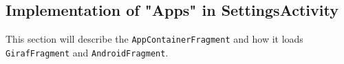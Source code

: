 \subsection{Implementation of "Apps" in SettingsActivity}
This section will describe the \lstinline!AppContainerFragment! and how it loads \lstinline!GirafFragment! and  \lstinline!AndroidFragment!.

